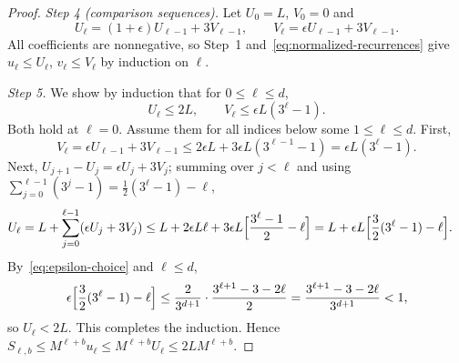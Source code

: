 \documentclass[11pt]{article}
\theoremstyle{definition}
\theoremstyle{remark}
\begin{document}
\begin{proof}
\emph{Step 4 (comparison sequences).} Let $U_0=L$, $V_0=0$ and
\[
 U_\ell=(1+\epsilon)U_{\ell-1}+3V_{\ell-1},
 \qquad
 V_\ell=\epsilon U_{\ell-1}+3V_{\ell-1}.
\]
All coefficients are nonnegative, so Step~1
and~\eqref{eq:normalized-recurrences} give $u_\ell\leq U_\ell$,
$v_\ell\leq V_\ell$ by induction on $\ell$.

\emph{Step 5.} We show by induction that for $0\leq\ell\leq d$,
\begin{equation}
\label{eq:comparison-bounds}
 U_\ell\leq2L,
 \qquad
 V_\ell\leq\epsilon L(3^\ell-1).
\end{equation}
Both hold at $\ell=0$. Assume them for all indices below some
$1\leq\ell\leq d$. First,
\[
 V_\ell=\epsilon U_{\ell-1}+3V_{\ell-1}
 \leq 2\epsilon L+3\epsilon L(3^{\ell-1}-1)
 =\epsilon L(3^\ell-1).
\]
Next, $U_{j+1}-U_j=\epsilon U_j+3V_j$; summing over $j<\ell$ and using
$\sum_{j=0}^{\ell-1}(3^j-1)=\tfrac12(3^\ell-1)-\ell$,
\begin{align*}
 U_\ell
 &=L+\sum_{j=0}^{\ell-1}(\epsilon U_j+3V_j)
 \leq L+2\epsilon L\ell+3\epsilon L\Bigl[\frac{3^\ell-1}{2}-\ell\Bigr]
 =L+\epsilon L\Bigl[\frac32(3^\ell-1)-\ell\Bigr].
\end{align*}
By~\eqref{eq:epsilon-choice} and $\ell\le d$,
\[
 \epsilon\Bigl[\frac32(3^\ell-1)-\ell\Bigr]
 \leq\frac{2}{3^{d+1}}\cdot\frac{3^{\ell+1}-3-2\ell}{2}
 =\frac{3^{\ell+1}-3-2\ell}{3^{d+1}}<1,
\]
so $U_\ell<2L$. This completes the induction. Hence
$S_{\ell,b}\le M^{\ell+b}u_\ell\le M^{\ell+b}U_\ell\leq2LM^{\ell+b}$.
\end{proof}
\end{document}
